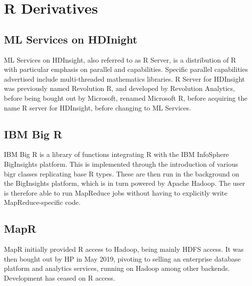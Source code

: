 \documentclass[10pt,a4paper]{article}
\begin{document}
\section{R Derivatives}
\label{sec:r-derivatives}

\subsection{ML Services on HDInight}
\label{sec:r-server-hdinsight}

ML Services on HDInsight, also referred to as R Server, is a
distribution of R with particular emphasis on parallel and
capabilities\cite{azure16:_r_server_hdins_r_analy}. Specific parallel
capabilities advertised include multi-threaded mathematics libraries.
R Server for HDInsight was previously named Revolution R, and
developed by Revolution Analytics, before being bought out by
Microsoft, renamed Microsoft R, before acquiring the name R server for
HDInsight, before changing to ML Services.

\subsection{IBM Big R}
\label{sec:ibm-big-r}

IBM Big R is a library of functions integrating R with the IBM
InfoSphere BigInsights platform\cite{inc.14:_infos_bigin_big_r}. This
is implemented through the introduction of various bigr classes
replicating base R types. These are then run in the background on the
BigInsights platform, which is in turn powered by Apache Hadoop. The
user is therefore able to run MapReduce jobs without having to
explicitly write MapReduce-specific code.

\subsection{MapR}
\label{sec:mapr}

MapR initially provided R access to Hadoop, being mainly HDFS
access\cite{mapr19:_indus_next_gener_data_platf_ai_analy}. It was then
bought out by HP in May 2019, pivoting to selling an enterprise
database platform and analytics services, running on Hadoop among
other backends. Development has ceased on R access.


\printbibliography{}
\end{document}
